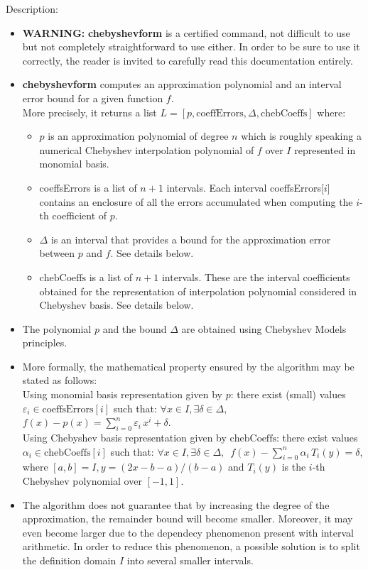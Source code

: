 \noindent Description: \begin{itemize}

\item \textbf{WARNING:} \textbf{chebyshevform} is a certified command, not difficult to use but not
   completely straightforward to use either. In order to be sure to use it
   correctly, the reader is invited to carefully read this documentation
   entirely.

\item \textbf{chebyshevform} computes an approximation polynomial and an interval error
   bound for a given function $f$.
   \\
   More precisely, it returns a list $L = \left[p, \textrm{coeffErrors},\Delta,\textrm{chebCoeffs} \right]$
   where:\begin{itemize}
   \item $p$ is an approximation polynomial of degree $n$ which is roughly speaking a
   numerical Chebyshev interpolation polynomial of $f$ over $I$ represented in
   monomial basis.
   \item coeffsErrors is a list of $n+1$ intervals. Each interval coeffsErrors[$i$]
   contains an enclosure of all the errors accumulated when computing the $i$-th
   coefficient of $p$.
   \item $\Delta$ is an interval that provides a bound for the approximation error
   between $p$ and $f$. See details below.
   \item $\textrm{chebCoeffs}$ is a list of $n+1$ intervals. These are the interval
   coefficients obtained for the representation of interpolation polynomial
   considered in Chebyshev basis. See details below.\end{itemize}

\item The polynomial $p$ and the bound $\Delta$ are obtained using Chebyshev Models
   principles.

\item More formally, the mathematical property ensured by the algorithm may be
   stated as follows:
   \\
   Using monomial basis representation given by $p$: there exist (small) values
   $\varepsilon_i \in \textrm{coeffsErrors}[i]$ such that:
   $\forall x \in I, \exists \delta \in \Delta,\,$
   $f(x)-p(x) = \sum\limits_{i=0}^{n} \varepsilon_i\, x^i + \delta$.
   \\
   Using Chebyshev basis representation given by $\textrm{chebCoeffs}$: there exist values
   $\alpha_i \in \textrm{chebCoeffs}[i]$ such that:
   $\forall x \in I, \exists \delta \in \Delta,\,$
   $f(x)-\sum\limits_{i=0}^{n} \alpha_i\, T_i(y)= \delta$,
   where $[a,b]=I, y=(2x-b-a)/(b-a)$ and $T_i(y)$ is the $i$-th Chebyshev polynomial
   over $[-1,1]$.

\item The algorithm does not guarantee that by increasing the degree of the
   approximation, the remainder bound will become smaller. Moreover, it may even
   become larger due to the dependecy phenomenon present with interval
   arithmetic. In order to reduce this phenomenon, a possible solution is to
   split the definition domain $I$ into several smaller intervals.
\end{itemize}
